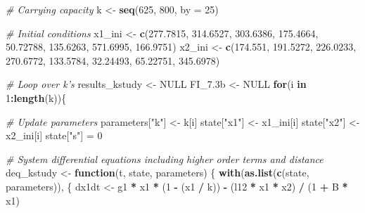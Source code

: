 \documentclass[12pt,twoside,openany]{reedthesis}
\newenvironment{Shaded}{\begin{snugshade}}{\end{snugshade}}
\newcommand{\KeywordTok}[1]{\textcolor[rgb]{0.13,0.29,0.53}{\textbf{#1}}}
\newcommand{\DataTypeTok}[1]{\textcolor[rgb]{0.13,0.29,0.53}{#1}}
\newcommand{\DecValTok}[1]{\textcolor[rgb]{0.00,0.00,0.81}{#1}}
\newcommand{\FloatTok}[1]{\textcolor[rgb]{0.00,0.00,0.81}{#1}}
\newcommand{\StringTok}[1]{\textcolor[rgb]{0.31,0.60,0.02}{#1}}
\newcommand{\CommentTok}[1]{\textcolor[rgb]{0.56,0.35,0.01}{\textit{#1}}}
\newcommand{\OtherTok}[1]{\textcolor[rgb]{0.56,0.35,0.01}{#1}}
\newcommand{\ControlFlowTok}[1]{\textcolor[rgb]{0.13,0.29,0.53}{\textbf{#1}}}
\newcommand{\OperatorTok}[1]{\textcolor[rgb]{0.81,0.36,0.00}{\textbf{#1}}}
\newcommand{\NormalTok}[1]{#1}
\begin{document}
\begin{Shaded}
\begin{Highlighting}[]
\CommentTok{# Carrying capacity}
\NormalTok{k <-}\StringTok{ }\KeywordTok{seq}\NormalTok{(}\DecValTok{625}\NormalTok{, }\DecValTok{800}\NormalTok{, }\DataTypeTok{by =} \DecValTok{25}\NormalTok{)}

\CommentTok{# Initial conditions}
\NormalTok{x1_ini <-}\StringTok{ }\KeywordTok{c}\NormalTok{(}\FloatTok{277.7815}\NormalTok{,}
          \FloatTok{314.6527}\NormalTok{,}
          \FloatTok{303.6386}\NormalTok{,}
          \FloatTok{175.4664}\NormalTok{,}
          \FloatTok{50.72788}\NormalTok{,}
          \FloatTok{135.6263}\NormalTok{,}
          \FloatTok{571.6995}\NormalTok{,}
          \FloatTok{166.9751}\NormalTok{)}
\NormalTok{x2_ini <-}\StringTok{ }\KeywordTok{c}\NormalTok{(}\FloatTok{174.551}\NormalTok{,}
          \FloatTok{191.5272}\NormalTok{,}
          \FloatTok{226.0233}\NormalTok{,}
          \FloatTok{270.6772}\NormalTok{,}
          \FloatTok{133.5784}\NormalTok{,}
          \FloatTok{32.24493}\NormalTok{,}
          \FloatTok{65.22751}\NormalTok{,}
          \FloatTok{345.6978}\NormalTok{)}

\CommentTok{# Loop over k's}
\NormalTok{results_kstudy <-}\StringTok{ }\OtherTok{NULL}
\NormalTok{FI_}\FloatTok{7.}\NormalTok{3b <-}\StringTok{ }\OtherTok{NULL}
\ControlFlowTok{for}\NormalTok{(i }\ControlFlowTok{in} \DecValTok{1}\OperatorTok{:}\KeywordTok{length}\NormalTok{(k))\{}
  
  \CommentTok{# Update parameters}
\NormalTok{  parameters[}\StringTok{"k"}\NormalTok{] <-}\StringTok{ }\NormalTok{k[i]}
\NormalTok{  state[}\StringTok{"x1"}\NormalTok{] <-}\StringTok{ }\NormalTok{x1_ini[i]}
\NormalTok{  state[}\StringTok{"x2"}\NormalTok{] <-}\StringTok{ }\NormalTok{x2_ini[i]}
\NormalTok{  state[}\StringTok{"s"}\NormalTok{] =}\StringTok{ }\DecValTok{0}
  
  \CommentTok{# System differential equations including higher order terms and distance}
\NormalTok{  deq_kstudy <-}\StringTok{ }\ControlFlowTok{function}\NormalTok{(t, state, parameters) \{}
    \KeywordTok{with}\NormalTok{(}\KeywordTok{as.list}\NormalTok{(}\KeywordTok{c}\NormalTok{(state, parameters)), \{}
\NormalTok{      dx1dt <-}\StringTok{ }\NormalTok{g1 }\OperatorTok{*}\StringTok{ }\NormalTok{x1 }\OperatorTok{*}\StringTok{ }\NormalTok{(}\DecValTok{1} \OperatorTok{-}\StringTok{ }\NormalTok{(x1 }\OperatorTok{/}\StringTok{ }\NormalTok{k)) }\OperatorTok{-}\StringTok{ }\NormalTok{(l12 }\OperatorTok{*}\StringTok{ }\NormalTok{x1 }\OperatorTok{*}\StringTok{ }\NormalTok{x2) }\OperatorTok{/}\StringTok{ }\NormalTok{(}\DecValTok{1} \OperatorTok{+}\StringTok{ }\NormalTok{B }\OperatorTok{*}\StringTok{ }\NormalTok{x1)}
      

\end{Highlighting}
\end{Shaded}
\end{document}
